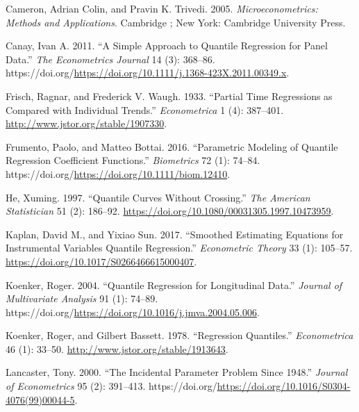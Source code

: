 \documentclass[
  letterpaper,
  DIV=11,
  numbers=noendperiod]{scrartcl}
\newlength{\cslhangindent}
\newlength{\cslentryspacingunit} %
\newenvironment{CSLReferences}[2] %
 {%
  \setlength{\parindent}{0pt}
  \ifodd #1
  \let\oldpar\par
  \def\par{\hangindent=\cslhangindent\oldpar}
  \fi
  \setlength{\parskip}{#2\cslentryspacingunit}
 }%
 {}
\begin{document}
\hypertarget{refs}{}
\begin{CSLReferences}{1}{0}
\leavevmode{}%
Cameron, Adrian Colin, and Pravin K. Trivedi. 2005.
\emph{Microeconometrics: Methods and Applications}. Cambridge ; New
York: Cambridge University Press.

\leavevmode{}%
Canay, Ivan A. 2011. {``A Simple Approach to Quantile Regression for
Panel Data.''} \emph{The Econometrics Journal} 14 (3): 368--86.
https://doi.org/\url{https://doi.org/10.1111/j.1368-423X.2011.00349.x}.

\leavevmode{}%
Frisch, Ragnar, and Frederick V. Waugh. 1933. {``Partial Time
Regressions as Compared with Individual Trends.''} \emph{Econometrica} 1
(4): 387--401. \url{http://www.jstor.org/stable/1907330}.

\leavevmode{}%
Frumento, Paolo, and Matteo Bottai. 2016. {``Parametric Modeling of
Quantile Regression Coefficient Functions.''} \emph{Biometrics} 72 (1):
74--84. https://doi.org/\url{https://doi.org/10.1111/biom.12410}.

\leavevmode{}%
He, Xuming. 1997. {``Quantile Curves Without Crossing.''} \emph{The
American Statistician} 51 (2): 186--92.
\url{https://doi.org/10.1080/00031305.1997.10473959}.

\leavevmode{}%
Kaplan, David M., and Yixiao Sun. 2017. {``Smoothed Estimating Equations
for Instrumental Variables Quantile Regression.''} \emph{Econometric
Theory} 33 (1): 105--57.
\url{https://doi.org/10.1017/S0266466615000407}.

\leavevmode{}%
Koenker, Roger. 2004. {``Quantile Regression for Longitudinal Data.''}
\emph{Journal of Multivariate Analysis} 91 (1): 74--89.
https://doi.org/\url{https://doi.org/10.1016/j.jmva.2004.05.006}.

\leavevmode{}%
Koenker, Roger, and Gilbert Bassett. 1978. {``Regression Quantiles.''}
\emph{Econometrica} 46 (1): 33--50.
\url{http://www.jstor.org/stable/1913643}.

\leavevmode{}%
Lancaster, Tony. 2000. {``The Incidental Parameter Problem Since
1948.''} \emph{Journal of Econometrics} 95 (2): 391--413.
https://doi.org/\url{https://doi.org/10.1016/S0304-4076(99)00044-5}.


\end{CSLReferences}
\end{document}
